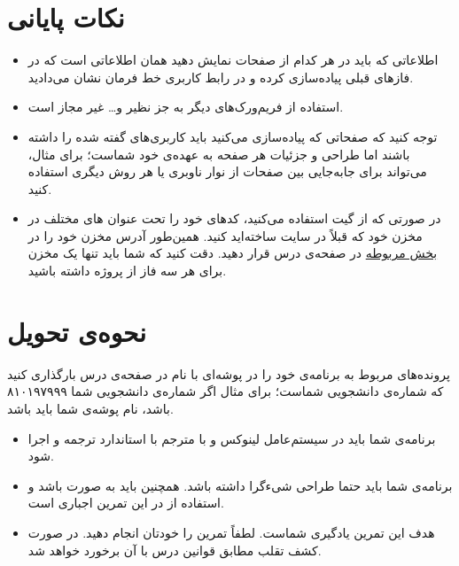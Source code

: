 \documentclass{utap}
\begin{document}
    \section{نکات پایانی}
        \begin{itemize}
            \item  اطلاعاتی که باید در هر کدام از صفحات نمایش دهید همان اطلاعاتی است که در فاز‌های قبلی پیاده‌سازی کرده‌ و در رابط کاربری خط فرمان نشان می‌دادید. 
            \item  
            استفاده از فریم‌ورک‌های دیگر به جز
                نظیر 
                و\dots{} غیر مجاز است.
                
            \item 
            توجه کنید که صفحاتی که پیادەسازی می‌کنید باید کاربری‌های گفته شده را داشته باشند اما طراحی و جزئیات هر صفحه به عهدەی خود شماست؛ برای مثال، می‌تواند برای جابه‌جایی بین صفحات از نوار ناوبری
            یا هر روش دیگری استفاده کنید. 
        	\item 
        	در صورتی که از گیت استفاده می‌کنید، کد‌های خود را تحت عنوان 
        	های
        	 مختلف در مخزن
        	 خود که قبلاً در سایت
        	 ساخته‌اید  کنید. همین‌طور آدرس مخزن خود را در 
        	\href{https://cecm.ut.ac.ir/mod/assign/view.php?id=83793}{بخش مربوطه}
        	  در صفحه‌ی درس قرار دهید. دقت کنید که شما باید تنها یک مخزن برای هر سه فاز از پروژه داشته باشید.
    	\end{itemize}

    \section{نحوه‌ی تحویل}
        پرونده‌‌های مربوط به برنامه‌ی خود را در پوشه‌ای با نام  در صفحه‌ی  درس بارگذاری کنید که  شماره‌ی دانشجویی شماست؛ برای مثال اگر شماره‌ی دانشجویی شما ۸۱۰۱۹۷۹۹۹ باشد، نام پوشه‌ی شما باید  باشد.
        \begin{itemize}
            \item
                        برنامه‌ی شما باید در سیستم‌عامل لینوکس و با مترجم  با استاندارد  ترجمه و اجرا شود.
                    \item
                        برنامه‌ی شما باید حتما طراحی شیءگرا داشته باشد. همچنین باید به صورت  باشد و استفاده از  در این تمرین اجباری است.
                    \item
                        هدف این تمرین یادگیری شماست. لطفاً تمرین را خودتان انجام دهید. در صورت کشف تقلب مطابق قوانین درس با آن برخورد خواهد شد.
        \end{itemize}
\end{document}

